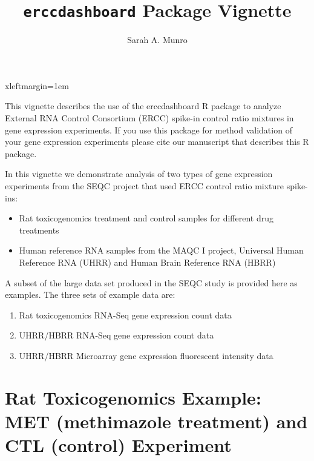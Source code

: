\documentclass{article}
\begin{document}



 {xleftmargin=1em}
\renewenvironment{Schunk}{\vspace{\topsep}}{\vspace{\topsep}}
\title{{\tt erccdashboard} Package Vignette}
\author{Sarah A. Munro}
\maketitle

This vignette describes the use of the erccdashboard R package to analyze 
External RNA Control Consortium (ERCC) spike-in control ratio mixtures in gene
expression experiments. If you use this package for method validation of your
gene expression experiments please cite our manuscript that describes this R 
package.

In this vignette we demonstrate analysis of two types of gene expression experiments
from the SEQC project that used ERCC control ratio mixture spike-ins:
\begin{itemize}
  \item Rat toxicogenomics treatment and control samples for different drug
  treatments
  \item Human reference RNA samples from the MAQC I project, Universal Human 
  Reference RNA (UHRR) and Human Brain Reference RNA (HBRR)
\end{itemize}

A subset of the large data set produced in the SEQC study is provided here as 
examples. The three sets of example data are: 

\begin{enumerate}
  \item Rat toxicogenomics RNA-Seq gene expression count data
  \item UHRR/HBRR RNA-Seq gene expression count data
  \item UHRR/HBRR Microarray gene expression fluorescent intensity data
\end{enumerate}


\section{Rat Toxicogenomics Example: MET (methimazole treatment) and CTL 
(control) Experiment}
\end{document}
